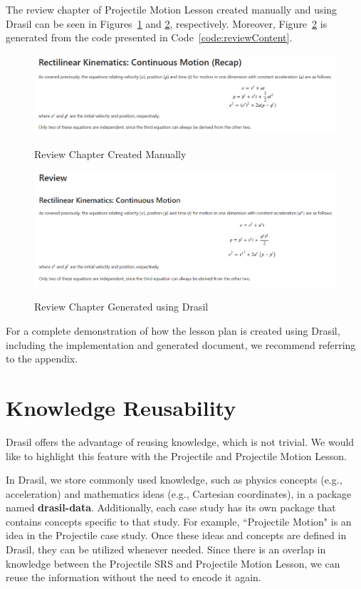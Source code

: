The review chapter of Projectile Motion Lesson created manually and using 
Drasil can be seen in Figures~\ref{fig:review_manual} and 
\ref{fig:review_drasil}, respectively. Moreover, Figure~\ref{fig:review_drasil} 
is generated from the code presented in Code~\ref{code:reviewContent}.

\begin{figure}[h!]
	\caption{Review Chapter Created Manually}
	\includegraphics[width=1\textwidth]{figures/review_manual.png}
	\label{fig:review_manual}
\end{figure}

\begin{figure}[h!]
	\caption{Review Chapter Generated using Drasil}
	\includegraphics[width=1\textwidth]{figures/review_drasil.png}
	\label{fig:review_drasil}
\end{figure}

For a complete demonstration of how the lesson plan is created using Drasil, 
including the implementation and generated document, we recommend referring to 
the appendix. 

\section{Knowledge Reusability}
Drasil offers the advantage of reusing knowledge, which is not trivial. We 
would like to highlight this feature with the Projectile and Projectile Motion 
Lesson. 

In Drasil, we store commonly used knowledge, such as physics concepts (e.g., 
acceleration) and mathematics ideas (e.g., Cartesian coordinates), in a package 
named \textbf{drasil-data}. Additionally, each case study has its own package 
that contains concepts specific to that study. For example, ``Projectile 
Motion" is an idea in the Projectile case study. Once these ideas and concepts 
are defined in Drasil, they can be utilized whenever needed. Since there is an 
overlap in knowledge between the Projectile SRS and Projectile Motion Lesson, 
we can reuse the information without the need to encode it again.


